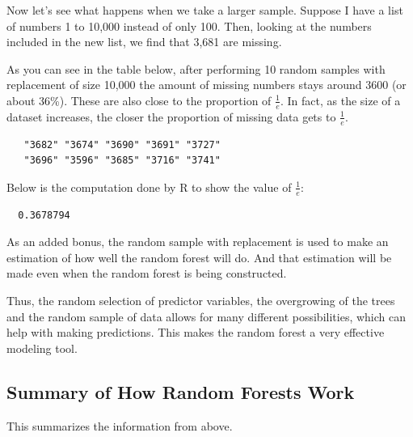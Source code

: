 \documentclass[12pt,twoside]{reedthesis}
\begin{document}
  Now let's see what happens when we take a larger sample. Suppose I have
  a list of numbers 1 to 10,000 instead of only 100. Then, looking at the
  numbers included in the new list, we find that 3,681 are missing.
  
  As you can see in the table below, after performing 10 random samples
  with replacement of size 10,000 the amount of missing numbers stays
  around 3600 (or about 36\%). These are also close to the proportion of
  \(\frac{1}{e}\). In fact, as the size of a dataset increases, the closer
  the proportion of missing data gets to \(\frac{1}{e}\).
  
  \begin{verbatim}
   "3682" "3674" "3690" "3691" "3727"
   "3696" "3596" "3685" "3716" "3741"
  \end{verbatim}
  
  Below is the computation done by R to show the value of \(\frac{1}{e}\):
  
  \begin{verbatim}
  0.3678794
  \end{verbatim}
  
  As an added bonus, the random sample with replacement is used to make an
  estimation of how well the random forest will do. And that estimation
  will be made even when the random forest is being constructed.
  
  Thus, the random selection of predictor variables, the overgrowing of
  the trees and the random sample of data allows for many different
  possibilities, which can help with making predictions. This makes the
  random forest a very effective modeling tool.
  
  \newpage
  
  \subsection{Summary of How Random Forests
  Work}\label{summary-of-how-random-forests-work}
  
  This summarizes the information from above.
  
\end{document}
